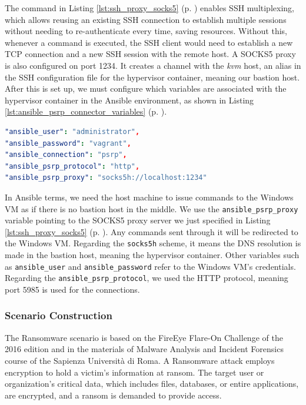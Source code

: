 The command in Listing \ref{lst:ssh_proxy_socks5} (p. \pageref{lst:ssh_proxy_socks5}) enables SSH multiplexing, which allows reusing an existing SSH connection to establish multiple sessions without needing to re-authenticate every time, saving resources. Without this, whenever a command is executed, the SSH client would need to establish a new TCP connection and a new SSH session with the remote host. A SOCKS5 proxy is also configured on port 1234. It creates a channel with the \textit{kvm} host, an alias in the SSH configuration file for the hypervisor container, meaning our bastion host. After this is set up, we must configure which variables are associated with the hypervisor container in the Ansible environment, as shown in Listing \ref{lst:ansible_psrp_connector_variables} (p. \pageref{lst:ansible_psrp_connector_variables}).

\begin{lstlisting}[language=yaml,caption=Ansible Variables - Hypervisor Container.,numbers=none,label={lst:ansible_psrp_connector_variables}]
"ansible_user": "administrator",
"ansible_password": "vagrant",
"ansible_connection": "psrp",
"ansible_psrp_protocol": "http",
"ansible_psrp_proxy": "socks5h://localhost:1234"
\end{lstlisting}

In Ansible terms, we need the host machine to issue commands to the Windows VM as if there is no bastion host in the middle. We use the \texttt{ansible\_psrp\_proxy} variable pointing to the SOCKS5 proxy server we just specified in Listing \ref{lst:ssh_proxy_socks5} (p. \pageref{lst:ssh_proxy_socks5}). Any commands sent through it will be redirected to the Windows VM. Regarding the \texttt{socks5h} scheme, it means the DNS resolution is made in the bastion host, meaning the hypervisor container. Other variables such as \texttt{ansible\_user} and \texttt{ansible\_password} refer to the Windows VM's credentials. Regarding the \texttt{ansible\_psrp\_protocol}, we used the HTTP protocol, meaning port 5985 is used for the connections.

\subsubsection{Scenario Construction} \label{sec:validation_ransomware_construction}

The Ransomware scenario is based on the FireEye Flare-On Challenge of the 2016 edition and in the materials of Malware Analysis and Incident Forensics course of the Sapienza Università di Roma. A Ransomware attack employs encryption to hold a victim's information at ransom. The target user or organization's critical data, which includes files, databases, or entire applications, are encrypted, and a ransom is demanded to provide access. 

